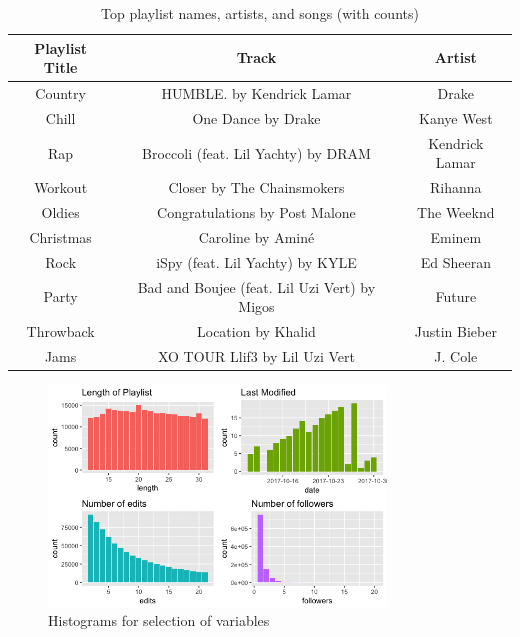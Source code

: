\documentclass{article} %
\begin{document}
\begin{table}[h!]
\caption{Top playlist names, artists, and songs (with counts)}
\centering
  \begin{tabular}{|c|c|c|} 
  	\hline 
  	Playlist Title & Track & Artist \\
  	\hline
  	Country  & HUMBLE. by Kendrick Lamar  & Drake  \\ 
  	Chill  & One Dance by Drake  & Kanye West  \\
  	Rap  & Broccoli (feat. Lil Yachty) by DRAM  & Kendrick Lamar  \\
  	Workout  & Closer by The Chainsmokers  & Rihanna  \\
  	Oldies  & Congratulations by Post Malone  & The Weeknd  \\
  	Christmas  & Caroline by Aminé  & Eminem  \\
  	Rock  & iSpy (feat. Lil Yachty) by KYLE  & Ed Sheeran  \\
  	Party  & Bad and Boujee (feat. Lil Uzi Vert) by Migos  & Future  \\
  	Throwback  & Location by Khalid  & Justin Bieber  \\
  	Jams  & XO TOUR Llif3 by Lil Uzi Vert  & J. Cole \\
  	\hline
 \end{tabular}
\end{table}

\begin{figure}
  \centering
  \includegraphics[width = 0.8\textwidth]{histograms.png}
  \caption{Histograms for selection of variables}
  \label{fig:boat1}
\end{figure}

\end{document}
